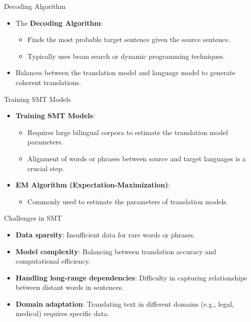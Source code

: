 \documentclass{beamer}
\begin{document}
\begin{frame}{Decoding Algorithm}
    \begin{itemize}
        \item The \textbf{Decoding Algorithm}:
        \begin{itemize}
            \item Finds the most probable target sentence given the source sentence.
            \item Typically uses beam search or dynamic programming techniques.
        \end{itemize}
        \item Balances between the translation model and language model to generate coherent translations.
    \end{itemize}
\end{frame}

\begin{frame}{Training SMT Models}
    \begin{itemize}
        \item \textbf{Training SMT Models}:
        \begin{itemize}
            \item Requires large bilingual corpora to estimate the translation model parameters.
            \item Alignment of words or phrases between source and target languages is a crucial step.
        \end{itemize}
        \item \textbf{EM Algorithm (Expectation-Maximization)}:
        \begin{itemize}
            \item Commonly used to estimate the parameters of translation models.
        \end{itemize}
    \end{itemize}
\end{frame}

\begin{frame}{Challenges in SMT}
    \begin{itemize}
        \item \textbf{Data sparsity}: Insufficient data for rare words or phrases.
        \item \textbf{Model complexity}: Balancing between translation accuracy and computational efficiency.
        \item \textbf{Handling long-range dependencies}: Difficulty in capturing relationships between distant words in sentences.
        \item \textbf{Domain adaptation}: Translating text in different domains (e.g., legal, medical) requires specific data.
    \end{itemize}
\end{frame}
\end{document}
